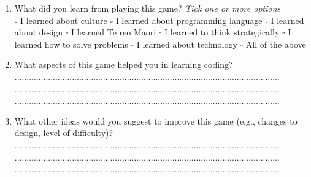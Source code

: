 \documentclass[12pt]{article}\pagestyle{myheadings}
\theoremstyle{plain}
\begin{document}
\begin{enumerate}
\item What did you learn from playing this game? \textit{Tick one or more options}\\
$\square$  I learned about culture $\square$  I learned about programming language $\square$ I learned about design $\square$ I learned Te reo Maori $\square$ I learned to think strategically $\square$ I learned how to solve problems $\square$ I learned about technology
$\square$ All of the above
\item What aspects of this game helped you in learning coding?\\
...............................................................................................................\\
...............................................................................................................\\
...............................................................................................................\\


\item What other ideas would you suggest to improve this game (e.g., changes to design, level of difficulty)?\\
...............................................................................................................\\
...............................................................................................................\\
...............................................................................................................\\


\end{enumerate}
\end{document}
